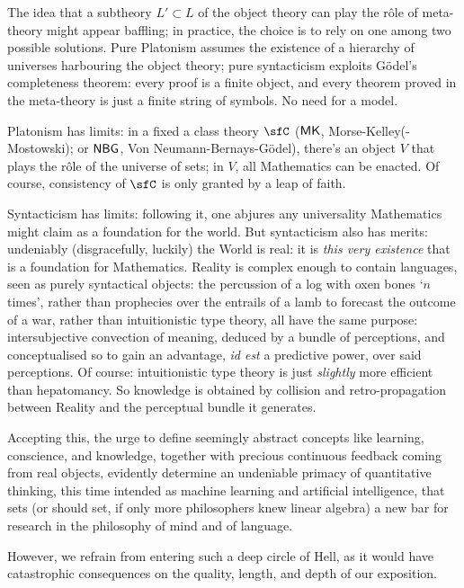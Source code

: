 The idea that a subtheory $L'\subset L$ of the object theory can play the r\^ole of meta-theory might appear baffling; in practice, the choice is to rely on one among two possible solutions. Pure Platonism assumes the existence of a hierarchy of universes harbouring the object theory; pure syntacticism exploits G\"odel's completeness theorem: every proof is a finite object, and every theorem proved in the meta-theory is just a finite string of symbols. No need for a model.

Platonism has limits: in a fixed a class theory $\sfC$ ($\sf MK$, Morse-Kelley(-Mostowski); or $\sf NBG$, Von Neumann-Bernays-G\"odel), there's an object $V$ that plays the r\^ole of the universe of sets; in $V$, all Mathematics can be enacted. Of course, consistency of $\sfC$ is only granted by a leap of faith.

Syntacticism has limits: following it, one abjures any universality Mathematics might claim as a foundation for the world. But syntacticism also has merits: undeniably (disgracefully, luckily) the World is real: it is \emph{this very existence} that is a foundation for Mathematics. Reality is complex enough to contain languages, seen as purely syntactical objects: the percussion of a log with oxen bones `$n$ times', rather than prophecies over the entrails of a lamb to forecast the outcome of a war, rather than intuitionistic type theory, all have the same purpose: intersubjective convection of meaning, deduced by a bundle of perceptions, and conceptualised so to gain an advantage, \emph{id est} a predictive power, over said perceptions. 
Of course: intuitionistic type theory is just \emph{slightly} more efficient than hepatomancy.
So knowledge is obtained by collision and retro-propagation between Reality and the perceptual bundle it generates.

Accepting this, the urge to define seemingly abstract concepts like learning, conscience, and knowledge, together with precious continuous feedback coming from real objects, evidently determine an undeniable primacy of quantitative thinking, this time intended as machine learning and artificial intelligence, that sets (or should set, if only more philosophers knew linear algebra) a new bar for research in the philosophy of mind and of language.

However, we refrain from entering such a deep circle of Hell, as it would have catastrophic consequences on the quality, length, and depth of our exposition.

